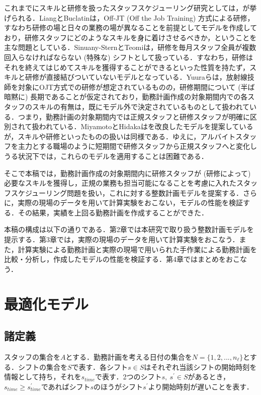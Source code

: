 \documentclass[twocolumn]{jsarticle}
\begin{document}
これまでにスキルと研修を扱ったスタッフスケジューリング研究としては，\cite{bib:senkou_Off, bib:senkou2, bib:senkou_Israel, bib:senkou1}が挙げられる．LiangとBuclatin\cite{bib:senkou_Off}は，Off-JT (Off the Job Training) 方式による研修，すなわち研修の場と日々の業務の場が異なることを前提としてモデルを作成しており，研修スタッフにどのようなスキルを身に着けさせるべきか，ということを主な問題としている．Sinuany-SternとTeomi\cite{bib:senkou_Israel}は，研修を毎月スタッフ全員が複数回入らなければならない (特殊な) シフトとして扱っている．すなわち，研修はそれを終えてはじめてスキルを獲得することができるといった性質を持たず，スキルと研修が直接結びついていないモデルとなっている．Yuuraら\cite{bib:senkou1}は，放射線技師を対象にOJT方式での研修が想定されているものの，研修期間について (半ば暗黙に) 長期であることが仮定されており，勤務計画作成の対象期間内での各スタッフのスキルの有無は，既にモデル外で決定されているものとして扱われている．つまり，勤務計画の対象期間内では正規スタッフと研修スタッフが明確に区別されて扱われている．MiyamotoとHidaka\cite{bib:senkou2}は\cite{bib:senkou1}を改良したモデルを提案しているが，スキルや研修といったものの扱いは同様である．ゆえに，アルバイトスタッフを主力とする職場のように短期間で研修スタッフから正規スタッフへと変化しうる状況下では，これらのモデルを適用することは困難である．

そこで本稿では，勤務計画作成の対象期間内に研修スタッフが (研修によって) 必要なスキルを獲得し，正規の業務も担当可能になることを考慮に入れたスタッフスケジューリング問題を扱い，これに対する整数計画モデルを提案する．さらに，実際の現場のデータを用いて計算実験をおこない，モデルの性能を検証する．その結果，実績を上回る勤務計画を作成することができた．

本稿の構成は以下の通りである．第2章では本研究で取り扱う整数計画モデルを提示する．第3章では，実際の現場のデータを用いて計算実験をおこなう．また，計算実験による勤務計画と実際の現場で用いられた手作業による勤務計画を比較・分析し，作成したモデルの性能を検証する．第4章ではまとめをおこなう．

\section{最適化モデル}
\subsection{諸定義}
スタッフの集合を$A$とする．勤務計画を考える日付の集合を$N = \{ 1, 2, ..., n_{\ell} \}$とする．シフトの集合を$S$で表す．各シフト$s \in S$はそれぞれ当該シフトの開始時刻を情報として持ち，それを$s_{time}$で表す．2つのシフト$s, \ s^{\prime} \in S$があるとき，$s_{time} \geq s_{time}^{\prime}$であればシフト$s$のほうがシフト$s^{\prime}$より開始時刻が遅いことを表す．
\end{document}
